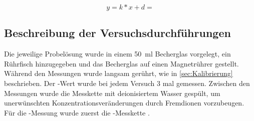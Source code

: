 \documentclass{article}
\begin{document}
      \begin{equation}
        y = k * x + d = 
      \end{equation}
      
    \subsection{Beschreibung der Versuchsdurchführungen} \label{sec:Versuch}
    
      Die jeweilige Probelösung wurde in einem \SI[mode=text]{50}{\milli\litre} Becherglas vorgelegt, ein Rührfisch hinzugegeben und das Becherglas auf einen Magnetrührer gestellt. Während den Messungen wurde langsam gerührt, wie in \ref{sec:Kalibrierung} beschrieben. Der \pH-Wert wurde bei jedem Versuch 3 mal gemessen. Zwischen den Messungen wurde die Messkette mit deionisiertem Wasser gespült, um unerwünschten Konzentrationsveränderungen durch Fremdionen vorzubeugen. Für die \pH-Messung wurde zuerst die \pH-Messkette . 
      
\end{document}
